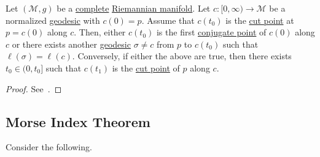 \begin{proposition}
	Let \((\mathcal{M} , g)\) be a \hyperref[def:geodesically-complete]{complete} \hyperref[def:Riemannian-manifold]{Riemannian manifold}. Let \(c\colon [0, \infty ) \to \mathcal{M} \) be a normalized \hyperref[def:geodesic]{geodesic} with \(c(0) = p\). Assume that \(c(t_0)\) is the \hyperref[def:cut-point]{cut point} at \(p = c(0)\) along \(c\). Then, either \(c(t_0)\) is the first \hyperref[def:conjugate-point]{conjugate point} of \(c(0)\) along \(c\) or there exists another \hyperref[def:geodesic]{geodesic} \(\sigma \neq c\) from \(p\) to \(c(t_0)\) such that \(\ell (\sigma ) = \ell (c)\). Conversely, if either the above are true, then there exists \(t_0 \in (0, t_0]\) such that \(c(t_1)\) is the \hyperref[def:cut-point]{cut point} of \(p\) along \(c\).
\end{proposition}
\begin{proof}
	See~\cite{flaherty2013riemannian}.
\end{proof}

\subsection{Morse Index Theorem}
Consider the following.

